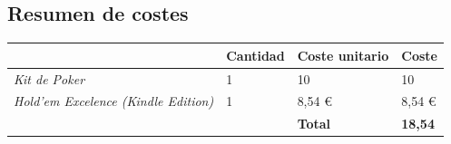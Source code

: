 

\subsection{Resumen de costes}

\begin{longtable}[c]{ll|l|l|}
\hline
\rowcolor{lightgray}\multicolumn{1}{|l|}{\textbf{Elemento}} & \textbf{Cantidad} & \textbf{Coste unitario} & \textbf{Coste} \\ \hline
\multicolumn{1}{|l|}{\textit{Kit de Poker}} & 1 & 10 & 10 \\ \hline
\multicolumn{1}{|l|}{\textit{Hold'em Excelence (Kindle Edition)}} & 1 & 8,54 € & 8,54 € \\ \hline
 &  & \textbf{Total} & \textbf{18,54} \\ \cline{3-4} 

\end{longtable}
